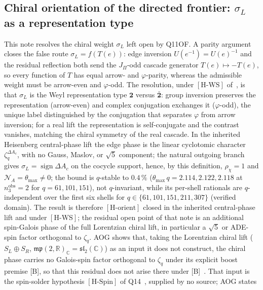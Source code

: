 \documentclass[11pt,a4paper]{article}
\theoremstyle{definition}
\newcommand{\HSpin}{\ensuremath{[\mathrm{H\text{-}Spin}]}}
\newcommand{\HWS}{\ensuremath{[\mathrm{H\text{-}WS}]}}
\begin{document}
    \subsection{Chiral orientation of the directed frontier: $\sigma_L$ as a representation
    type~\cite{Beau2026cho}}
      This note resolves the chiral weight $\sigma_L$ left open by Q11OF.
      A parity argument closes the false route $\sigma_L=f(T(e))$: edge inversion $U(e^{-1})=U(e)^{-1}$ and the
      residual reflection both send the $J_\Pi$-odd cascade generator $T(e)\mapsto-T(e)$, so every function of $T$
      has equal arrow- and $\varphi$-parity, whereas the admissible weight must be arrow-even and $\varphi$-odd.
      The resolution, under \HWS{} of~\cite{Beau2026q11of}, is that $\sigma_L$ is the Weyl representation type
      $\mathbf{2}$ versus $\bar{\mathbf{2}}$:
      group inversion preserves the representation (arrow-even) and complex conjugation exchanges it
      ($\varphi$-odd), the unique label distinguished by the conjugation that separates $\varphi$ from arrow
      inversion; for a real lift the representation is self-conjugate and the contrast vanishes, matching the
      chiral symmetry of the real cascade.
      In the inherited Heisenberg central-phase lift the
      edge phase is the linear cyclotomic character $\zeta_q^{\Delta A_c}$, with no Gauss, Maslov, or $\sqrt{5}$
      component; the natural outgoing branch gives $\sigma_L=\operatorname{sign}\Delta A_c$ on the cocycle support,
      hence, by this definition, $\rho_\chi=1$ and $\mathcal N_A=\theta_{\max}\neq0$; the bound is $q$-stable to $0.4\,\%$
      ($\theta_{\max}\,q=2.114,2.122,2.118$ at $n_3^{\mathrm{obs}}=2$ for $q=61,101,151$), not $q$-invariant, while its
      per-shell rationals are $q$-independent over the first six shells for $q\in\{61,101,151,211,307\}$ (verified domain).
      The result is therefore $[\mathrm{H\text{-}orient}]$ closed in the inherited central-phase lift and under \HWS{};
      the residual
      open point of that note is an additional spin-Galois phase of the full Lorentzian chiral lift, in particular a
      $\sqrt{5}$ or ADE-spin factor orthogonal to $\zeta_q$.
      AOG shows that, taking the Lorentzian chiral lift ($S_L\oplus S_R$,
      $\mathfrak{mp}(2,\mathbb{R})_{\mathbb{C}}=\mathfrak{sl}_2(\mathbb{C})$) as an input it does not construct, the
      chiral phase carries no Galois-spin factor orthogonal to $\zeta_q$ under its explicit boost premise [B], so that this
      residual does not arise there under [B]~\cite{Beau2026aog}.
      That input is the spin-solder hypothesis \HSpin{} of Q14~\cite{Beau2026q14}, supplied by no source; AOG states
\end{document}
